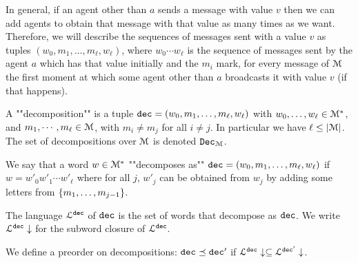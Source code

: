 In general, if an agent other than $a$ sends a message with value $v$ then we can add agents to obtain that message with that value as many times as we want.
Therefore, we will describe the sequences of messages sent with a value $v$ as tuples $(w_0, m_1, \ldots, m_\ell, w_\ell)$, where $w_0 \cdots w_\ell$ is the sequence of messages sent by the agent $a$ which has that value initially and the $m_i$ mark, for every message of $\mathcal{M}$ the first moment at which some agent other than $a$ broadcasts it with value $v$ (if that happens).

\begin{definition}
	A ""decomposition"" is a tuple $\mathtt{dec} = (w_0, m_1, \ldots, m_\ell, w_\ell)$ with $w_0, \ldots, w_\ell \in \mathcal{M}^*$, and $m_1, \cdots, m_\ell \in \mathcal{M}$, with $m_i \neq m_j$ for all $i\neq j$. In particular we have $\ell \leq |\mathcal{M}|$. The set of decompositions over $\mathcal{M}$ is denoted $\mathtt{Dec}_{\mathcal{M}}$.
	
	We say that a word $w \in \mathcal{M}^*$ ""decomposes as"" $\mathtt{dec} = (w_0, m_1, \ldots, m_\ell, w_\ell)$ if $w = w'_0 w'_1 \cdots w'_\ell$ where for all $j$, $w'_j$ can be obtained from $w_j$ by adding some letters from $\{m_1, \ldots, m_{j-1}\}$.
	
	The language $\mathcal{L}^{\mathtt{\mathtt{dec}}}$ of $\mathtt{dec}$ is the set of words that decompose as $\mathtt{dec}$. We write $\mathcal{L}^{\mathtt{\mathtt{dec}}}\downarrow$ for the subword closure of $\mathcal{L}^{\mathtt{\mathtt{dec}}}$.
	
	We define a preorder on decompositions:
	$\mathtt{dec} \preceq \mathtt{dec}'$ if $\mathcal{L}^{\mathtt{\mathtt{dec}}}\downarrow \subseteq \mathcal{L}^{\mathtt{\mathtt{dec}'}}\downarrow$. 
\end{definition}


